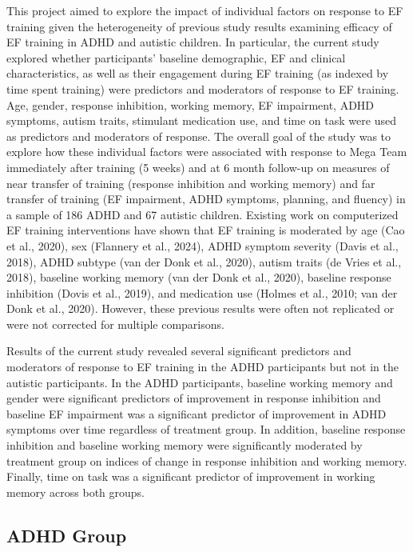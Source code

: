 \documentclass[
  letterpaper,
]{ut-thesis}
\begin{document}
This project aimed to explore the impact of individual factors on
response to EF training given the heterogeneity of previous study
results examining efficacy of EF training in ADHD and autistic children.
In particular, the current study explored whether participants' baseline
demographic, EF and clinical characteristics, as well as their
engagement during EF training (as indexed by time spent training) were
predictors and moderators of response to EF training. Age, gender,
response inhibition, working memory, EF impairment, ADHD symptoms,
autism traits, stimulant medication use, and time on task were used as
predictors and moderators of response. The overall goal of the study was
to explore how these individual factors were associated with response to
Mega Team immediately after training (5 weeks) and at 6 month follow-up
on measures of near transfer of training (response inhibition and
working memory) and far transfer of training (EF impairment, ADHD
symptoms, planning, and fluency) in a sample of 186 ADHD and 67 autistic
children. Existing work on computerized EF training interventions have
shown that EF training is moderated by age (Cao et al., 2020), sex
(Flannery et al., 2024), ADHD symptom severity (Davis et al., 2018),
ADHD subtype (van der Donk et al., 2020), autism traits (de Vries et
al., 2018), baseline working memory (van der Donk et al., 2020),
baseline response inhibition (Dovis et al., 2019), and medication use
(Holmes et al., 2010; van der Donk et al., 2020). However, these
previous results were often not replicated or were not corrected for
multiple comparisons.

Results of the current study revealed several significant predictors and
moderators of response to EF training in the ADHD participants but not
in the autistic participants. In the ADHD participants, baseline working
memory and gender were significant predictors of improvement in response
inhibition and baseline EF impairment was a significant predictor of
improvement in ADHD symptoms over time regardless of treatment group. In
addition, baseline response inhibition and baseline working memory were
significantly moderated by treatment group on indices of change in
response inhibition and working memory. Finally, time on task was a
significant predictor of improvement in working memory across both
groups.

\subsection{ADHD Group}\label{adhd-group-1}
\end{document}
